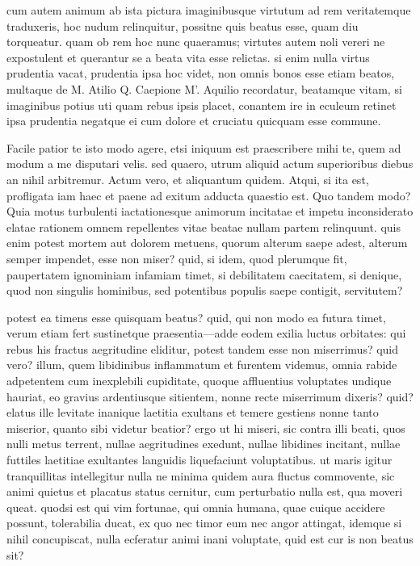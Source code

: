  cum autem animum ab ista pictura imaginibusque virtutum ad rem veritatemque traduxeris, hoc nudum relinquitur, possitne quis beatus esse, quam diu torqueatur. quam ob rem hoc nunc quaeramus; virtutes autem noli vereri ne expostulent et querantur se a beata vita esse relictas. si enim nulla virtus prudentia vacat, prudentia ipsa hoc videt, non omnis bonos esse etiam beatos, multaque de M. Atilio Q. Caepione M'. Aquilio recordatur, beatamque vitam, si imaginibus potius uti quam rebus ipsis placet, conantem ire in eculeum retinet ipsa prudentia negatque ei cum dolore et cruciatu quicquam esse commune.

 Facile patior te isto modo agere, etsi iniquum est praescribere mihi te, quem ad modum a me disputari velis. sed quaero, utrum aliquid actum superioribus diebus an nihil arbitremur. Actum vero, et aliquantum quidem. Atqui, si ita est, profligata iam haec et paene ad exitum adducta quaestio est. Quo tandem modo? Quia motus turbulenti iactationesque animorum incitatae et impetu inconsiderato elatae rationem omnem repellentes vitae beatae nullam partem relinquunt. quis enim potest mortem aut dolorem metuens, quorum alterum saepe adest, alterum semper impendet, esse non miser? quid, si idem, quod plerumque fit, paupertatem ignominiam infamiam timet, si debilitatem caecitatem, si denique, quod non singulis hominibus, sed potentibus populis saepe contigit, servitutem?

 potest ea timens esse quisquam beatus? quid, qui non modo ea futura timet, verum etiam fert sustinetque praesentia—adde eodem exilia luctus orbitates: qui rebus his fractus aegritudine eliditur, potest tandem esse non miserrimus? quid vero? illum, quem libidinibus inflammatum et furentem videmus, omnia rabide adpetentem cum inexplebili cupiditate, quoque affluentius voluptates undique hauriat, eo gravius ardentiusque sitientem, nonne recte miserrimum dixeris? quid? elatus ille levitate inanique laetitia exultans et temere gestiens nonne tanto miserior, quanto sibi videtur beatior? ergo ut hi miseri, sic contra illi beati, quos nulli metus terrent, nullae aegritudines exedunt, nullae libidines incitant, nullae futtiles laetitiae exultantes languidis liquefaciunt voluptatibus. ut maris igitur tranquillitas intellegitur nulla ne minima quidem aura fluctus commovente, sic animi quietus et placatus status cernitur, cum perturbatio nulla est, qua moveri queat. quodsi est qui vim fortunae, qui omnia humana, quae cuique accidere possunt, tolerabilia ducat, ex quo nec timor eum nec angor attingat, idemque si nihil concupiscat, nulla ecferatur animi inani voluptate, quid est cur is non beatus sit?


